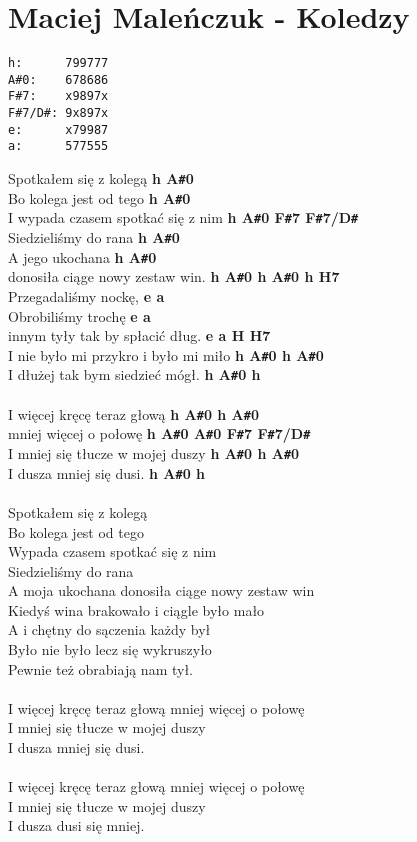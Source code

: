 \section{Maciej Maleńczuk - Koledzy}
\begin{verbatim}
h:      799777
A#0:    678686
F#7:    x9897x
F#7/D#: 9x897x
e:      x79987
a:      577555
\end{verbatim}
Spotkałem się z kolegą \textbf{h A\texttt{\#}0}\\
Bo kolega jest od tego \textbf{h A\texttt{\#}0}\\
I wypada czasem spotkać się z nim \textbf{h A\texttt{\#}0 F\texttt{\#}7 F\texttt{\#}7/D\texttt{\#}}\\
Siedzieliśmy do rana \textbf{h A\texttt{\#}0}\\
A jego ukochana \textbf{h A\texttt{\#}0}\\
donosiła ciąge nowy zestaw win. \textbf{h A\texttt{\#}0 h A\texttt{\#}0 h H7}\\
Przegadaliśmy nockę, \textbf{e a}\\
Obrobiliśmy trochę \textbf{e a}\\
innym tyły tak by spłacić dług. \textbf{e a H H7}\\
I nie było mi przykro i było mi miło \textbf{h A\texttt{\#}0 h A\texttt{\#}0}\\
I dłużej tak bym siedzieć mógł. \textbf{h A\texttt{\#}0 h}\\
\\
I więcej kręcę teraz głową \textbf{h A\texttt{\#}0 h A\texttt{\#}0}\\
mniej więcej o połowę \textbf{h A\texttt{\#}0 A\texttt{\#}0 F\texttt{\#}7 F\texttt{\#}7/D\texttt{\#}}\\
I mniej się tłucze w mojej duszy \textbf{h A\texttt{\#}0 h A\texttt{\#}0}\\
I dusza mniej się dusi. \textbf{h A\texttt{\#}0 h}\\
\\
Spotkałem się z kolegą\\
Bo kolega jest od tego\\
Wypada czasem spotkać się z nim\\
Siedzieliśmy do rana\\
A moja ukochana donosiła ciąge nowy zestaw win\\
Kiedyś wina brakowało i ciągle było mało\\
A i chętny do sączenia każdy był\\
Było nie było lecz się wykruszyło\\
Pewnie też obrabiają nam tył.\\
\\
I więcej kręcę teraz głową mniej więcej o połowę\\
I mniej się tłucze w mojej duszy\\
I dusza mniej się dusi.\\
\\
I więcej kręcę teraz głową mniej więcej o połowę\\
I mniej się tłucze w mojej duszy\\
I dusza dusi się mniej.\\
\\
\newpage


